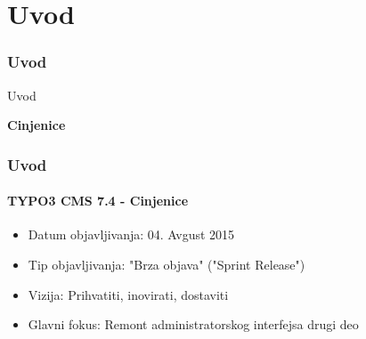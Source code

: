 %

\section{Uvod}
\begin{frame}[fragile]
	\frametitle{Uvod}

	\begin{center}\huge{Uvod}\end{center}
	\begin{center}\huge{\color{typo3darkgrey}\textbf{Cinjenice}}\end{center}

\end{frame}

\begin{frame}[fragile]
	\frametitle{Uvod}
	\framesubtitle{TYPO3 CMS 7.4 - Cinjenice}

	\begin{itemize}
		\item Datum objavljivanja: 04. Avgust 2015
		\item Tip objavljivanja: "Brza objava" ("Sprint Release")
		\item Vizija: Prihvatiti, inovirati, dostaviti
		\item Glavni fokus: Remont administratorskog interfejsa drugi deo
	\end{itemize}

\end{frame}

